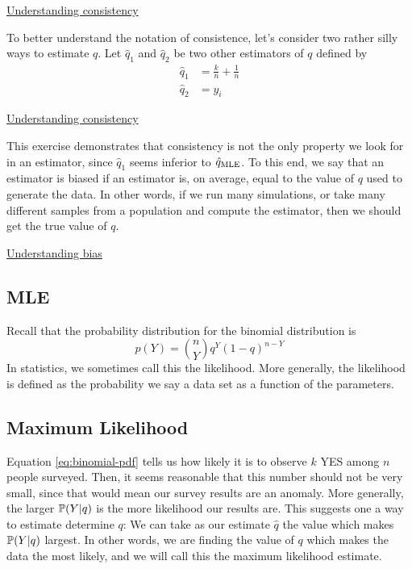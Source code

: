 \begin{example}
\href{https://colab.research.google.com/drive/1QarJhwPmSqCTQ-HwU_lXCUX6uvdhLdrM#scrollTo=Le6SGPp9i161&line=3&uniqifier=1}{Understanding consistency}
\end{example} 


To better understand the notation of consistence, let's consider two rather silly ways to estimate $q$. Let $\hat{q}_1$ and $\hat{q}_2$ be two other estimators of $q$ defined by 
\begin{align}
\hat{q}_{1} &= \frac{k}{n} + \frac{1}{n}\\
\hat{q}_{2} &= y_i
\end{align}

\begin{exercise}
\href{https://colab.research.google.com/drive/1QarJhwPmSqCTQ-HwU_lXCUX6uvdhLdrM#scrollTo=Le6SGPp9i161&line=3&uniqifier=1}{Understanding consistency}
\end{exercise} 


This exercise demonstrates that consistency is not the only property we look for in an estimator, since $\hat{q}_1$ seems inferior to $\hat{q}_{\rm MLE}$. To this end, we say that an estimator is {\dfn biased} if an estimator is, on average, equal to the value of $q$ used to generate the data. In other words, if we run many simulations, or take many different samples from a population and compute the estimator, then we should get the true value of $q$. 

\begin{exercise}
 \href{https://colab.research.google.com/drive/1QarJhwPmSqCTQ-HwU_lXCUX6uvdhLdrM#scrollTo=US27cD1JgXn_&line=3&uniqifier=1}{Understanding bias}
\end{exercise} 


\subsection{MLE}



Recall that the probability distribution for the binomial distribution is 
\begin{equation}\label{eq:binomial-pdf}
p(Y) = {n \choose Y}q^Y(1-q)^{n-Y}
\end{equation}
In statistics, we sometimes call this the {\dfn likelihood}. More generally, the likelihood is defined as the probability we say a data set as a function of the parameters. 

\subsection{Maximum Likelihood}
Equation \eqref{eq:binomial-pdf} tells us how likely it is to observe $k$ YES among $n$ people surveyed. Then, it seems reasonable that this number should not be very small, since that would mean our survey results are an anomaly. More generally, the larger $\mathbb P(Y|q)$ is the more likelihood our results are. This suggests one a way to estimate determine $q$: We can take as our estimate $\hat{q}$ the value which makes $\mathbb P(Y|q)$ largest. In other words, we are finding the value of $q$ which makes the data the most likely, and we will call this the {\dfn  maximum likelihood estimate}.

